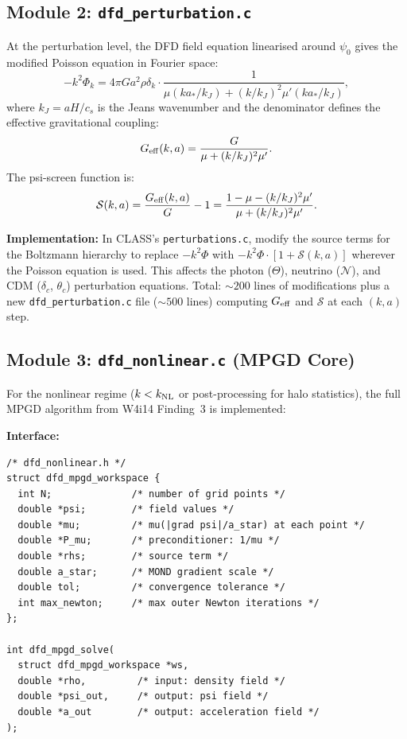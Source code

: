 \documentclass[11pt]{article}
\theoremstyle{definition}
\theoremstyle{remark}
\begin{document}
\subsection{Module 2: \texttt{dfd\_perturbation.c}}
\label{sec:dfd-perturbation}

At the perturbation level, the DFD field equation linearised around
$\psi_0$ gives the modified Poisson equation in Fourier space:
\begin{equation}
  -k^2 \Phi_k = 4\pi G a^2 \rho \delta_k \cdot
  \frac{1}{\mu(k a_* / k_J) + (k/k_J)^2 \mu'(k a_* / k_J)},
  \label{eq:dfd-poisson}
\end{equation}
where $k_J = a H / c_s$ is the Jeans wavenumber and the denominator defines
the effective gravitational coupling:
\begin{equation}
  G_{\rm eff}(k,a) = \frac{G}{\mu + (k/k_J)^2 \mu'}.
  \label{eq:geff}
\end{equation}
The psi-screen function is:
\begin{equation}
  \mathcal{S}(k,a) = \frac{G_{\rm eff}(k,a)}{G} - 1 =
  \frac{1 - \mu - (k/k_J)^2 \mu'}{\mu + (k/k_J)^2 \mu'}.
  \label{eq:psi-screen}
\end{equation}

\textbf{Implementation:} In CLASS's \texttt{perturbations.c}, modify the
source terms for the Boltzmann hierarchy to replace $-k^2 \Phi$ with
$-k^2 \Phi \cdot [1 + \mathcal{S}(k,a)]$ wherever the Poisson equation
is used. This affects the photon ($\Theta$), neutrino ($\mathcal{N}$),
and CDM ($\delta_c$, $\theta_c$) perturbation equations. Total: $\sim 200$
lines of modifications plus a new \texttt{dfd\_perturbation.c} file
($\sim 500$ lines) computing $G_{\rm eff}$ and $\mathcal{S}$ at each
$(k, a)$ step.

\subsection{Module 3: \texttt{dfd\_nonlinear.c} (MPGD Core)}
\label{sec:dfd-nonlinear}

For the nonlinear regime ($k < k_{\rm NL}$ or post-processing for
halo statistics), the full MPGD algorithm from W4i14 Finding~3 is
implemented:

\textbf{Interface:}
\begin{lstlisting}[caption={MPGD solver interface for CLASS integration}]
/* dfd_nonlinear.h */
struct dfd_mpgd_workspace {
  int N;              /* number of grid points */
  double *psi;        /* field values */
  double *mu;         /* mu(|grad psi|/a_star) at each point */
  double *P_mu;       /* preconditioner: 1/mu */
  double *rhs;        /* source term */
  double a_star;      /* MOND gradient scale */
  double tol;         /* convergence tolerance */
  int max_newton;     /* max outer Newton iterations */
};

int dfd_mpgd_solve(
  struct dfd_mpgd_workspace *ws,
  double *rho,         /* input: density field */
  double *psi_out,     /* output: psi field */
  double *a_out        /* output: acceleration field */
);
\end{lstlisting}
\end{document}
